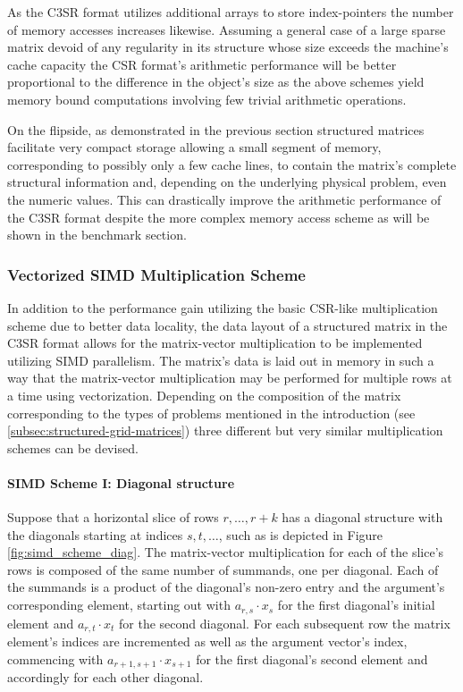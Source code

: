 \documentclass{article}
\begin{document}
      As the C3SR format utilizes additional arrays to store index-pointers the number of memory accesses increases likewise. Assuming a general case of a large sparse matrix devoid of any regularity in its structure whose size exceeds the machine's cache capacity the CSR format's arithmetic performance will be better proportional to the difference in the object's size as the above schemes yield memory bound computations involving few trivial arithmetic operations.

      On the flipside, as demonstrated in the previous section structured matrices facilitate very compact storage allowing a small segment of memory, corresponding to possibly only a few cache lines, to contain the matrix's complete structural information and, depending on the underlying physical problem, even the numeric values. This can drastically improve the arithmetic performance of the C3SR format despite the more complex memory access scheme as will be shown in the benchmark section.

    \subsubsection{Vectorized SIMD Multiplication Scheme} \label{subsubsec:vectorized-simd-multiplication-scheme}

      In addition to the performance gain utilizing the basic CSR-like multiplication scheme due to better data locality, the data layout of a structured matrix in the C3SR format allows for the matrix-vector multiplication to be implemented utilizing SIMD parallelism. The matrix's data is laid out in memory in such a way that the matrix-vector multiplication may be performed for multiple rows at a time using vectorization. Depending on the composition of the matrix corresponding to the types of problems mentioned in the introduction (see \ref{subsec:structured-grid-matrices}) three different but very similar multiplication schemes can be devised.

      \paragraph{SIMD Scheme I: Diagonal structure}

      Suppose that a horizontal slice of rows $r, \ldots, r+k$ has a diagonal structure with the diagonals starting at indices $s, t, \ldots $, such as is depicted in Figure \ref{fig:simd_scheme_diag}. The matrix-vector multiplication for each of the slice's rows is composed of the same number of summands, one per diagonal. Each of the summands is a product of the diagonal's non-zero entry and the argument's corresponding element, starting out with $a_{r,s} \cdot x_s$ for the first diagonal's initial element and $a_{r,t} \cdot x_t$ for the second diagonal. For each subsequent row the matrix element's indices are incremented as well as the argument vector's index, commencing with $a_{r+1, s+1} \cdot x_{s+1}$ for the first diagonal's second element and accordingly for each other diagonal.
\end{document}
